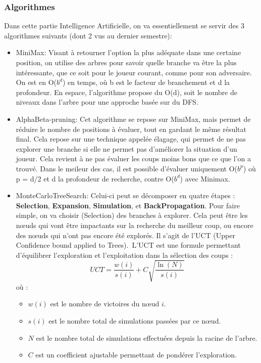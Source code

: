 \documentclass{article}
\begin{document}
\subsubsection{Algorithmes}
Dans cette partie Intelligence Artificielle, on va essentiellement se servir des 3 algorithmes suivants (dont 2 vus au dernier semestre):
\begin{itemize}
    \item MiniMax: Visant à retourner l'option la plus adéquate dans une certaine position, on utilise des arbres pour savoir quelle branche va être la
    plus intéressante, que ce soit pour le joueur courant, comme pour son adversaire. On est en O($b^d$) en temps, où b est le facteur de branchement et d la profondeur.
    En espace, l'algorithme propose du O(d), soit le nombre de niveaux dans l'arbre pour une approche basée sur du DFS.
    \item AlphaBeta-pruning: Cet algorithme se repose sur MiniMax, mais permet de réduire le nombre de positions à évaluer, tout en gardant le même résultat final. 
    Cela repose sur une technique appelée élagage, qui permet de ne pas explorer une branche si elle ne permet pas d'améliorer la situation 
    d'un joueur. Cela revient à ne pas évaluer les coups moins bons que ce que l'on a trouvé. Dans le meileur des cas, il est possible d'évaluer uniquement 
    O($b^p$) où p = d/2 et d la profondeur de recherche, contre O($b^d$) avec Minimax.
    \item MonteCarloTreeSearch:
    Celui-ci peut se décomposer en quatre étapes : \textbf{Selection}, \textbf{Expansion}, \textbf{Simulation}, et \textbf{BackPropagation}. Pour faire simple, on va choisir (Selection) des branches à explorer. Cela peut être les nœuds qui vont être impactants sur la recherche du meilleur coup, ou encore des nœuds qui n'ont pas encore été explorés. Il s'agit de l'UCT (Upper Confidence bound applied to Trees).\
    L'UCT est une formule permettant d'équilibrer l'exploration et l'exploitation dans la sélection des coups :
    \begin{equation}
    UCT = \frac{w(i)}{s(i)} + C \sqrt{\frac{\ln(N)}{s(i)}}
    \end{equation}
    où :
    \begin{itemize}
        \item $w(i)$ est le nombre de victoires du nœud $i$.
        \item $s(i)$ est le nombre total de simulations passées par ce nœud.
        \item $N$ est le nombre total de simulations effectuées depuis la racine de l'arbre.
        \item $C$ est un coefficient ajustable permettant de pondérer l'exploration.\
    \end{itemize} 


\end{itemize}
\end{document}

